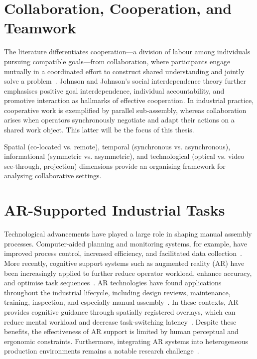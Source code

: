 \section{Collaboration, Cooperation, and Teamwork}\label{sec:collab}
The literature differentiates cooperation—a division of labour among
individuals pursuing compatible goals—from collaboration, where
participants engage mutually in a coordinated effort to construct
shared understanding and jointly solve a problem~\cite{roschelle1995construction}.  Johnson and Johnson's social interdependence theory further
emphasises positive goal interdependence, individual accountability, and
promotive interaction as hallmarks of effective cooperation\cite{johnson1989cooperation}.  In industrial practice, cooperative work is
exemplified by parallel sub-assembly, whereas collaboration arises when
operators synchronously negotiate and adapt their actions on a shared work
object. This latter will be the focus of this thesis.

Spatial (co-located vs. remote), temporal (synchronous vs. asynchronous),
informational (symmetric vs. asymmetric), and technological (optical vs.
video see-through, projection) dimensions provide an organising framework
for analysing collaborative settings\cite{feng2023comprehensive,samini2021review,roschelle1995construction}.


\section{AR-Supported Industrial Tasks}\label{sec:ar_industrial}
Technological advancements have played a large role in shaping manual assembly processes. Computer-aided planning and monitoring systems, for example, have improved process control, increased efficiency, and facilitated data collection~\cite{kärcher2018sensorDriven, Yong-liang2009Computer}. More recently, cognitive support systems such as augmented reality (AR) have been increasingly applied to further reduce operator workload, enhance accuracy, and optimise task sequences~\cite{stork2010cognitionInAssembly}.
AR technologies have found applications throughout the industrial lifecycle, including design reviews, maintenance, training, inspection, and especially manual assembly~\cite{deSouza2020surveyIndustrialAR, cim2024arAssemblyTrainingRev}. In these contexts, AR provides cognitive guidance through spatially registered overlays, which can reduce mental workload and decrease task-switching latency~\cite{stork2010cognitionInAssembly, tang2003comparative}. 
Despite these benefits, the effectiveness of AR support is limited by human perceptual and ergonomic constraints. Furthermore, integrating AR systems into heterogeneous production environments remains a notable research challenge~\cite{mekni2014augmented, al2025investigating}.


